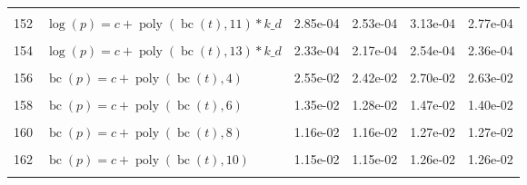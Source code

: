\documentclass[12pt,a4paper]{article}
\DeclareMathOperator{\bc}{bc}
\DeclareMathOperator{\poly}{poly}
\begin{document}
\begin{longtable}[t]{ll>{\raggedleft\arraybackslash}p{2cm}>{\raggedleft\arraybackslash}p{2cm}>{\raggedleft\arraybackslash}p{2cm}>{\raggedleft\arraybackslash}p{2cm}}
\cellcolor{gray!6}{151} & \cellcolor{gray!6}{$\log(p) = c + \poly\left( \bc(t), 10 \right) * k\_d$} & \cellcolor{gray!6}{3.64e-04} & \cellcolor{gray!6}{3.35e-04} & \cellcolor{gray!6}{4.03e-04} & \cellcolor{gray!6}{3.70e-04}\\
152 & $\log(p) = c + \poly\left( \bc(t), 11 \right) * k\_d$ & 2.85e-04 & 2.53e-04 & 3.13e-04 & 2.77e-04\\
\cellcolor{gray!6}{153} & \cellcolor{gray!6}{$\log(p) = c + \poly\left( \bc(t), 12 \right) * k\_d$} & \cellcolor{gray!6}{2.23e-04} & \cellcolor{gray!6}{2.10e-04} & \cellcolor{gray!6}{2.43e-04} & \cellcolor{gray!6}{2.27e-04}\\
154 & $\log(p) = c + \poly\left( \bc(t), 13 \right) * k\_d$ & 2.33e-04 & 2.17e-04 & 2.54e-04 & 2.36e-04\\
\cellcolor{gray!6}{155} & \cellcolor{gray!6}{$\bc(p) = c + \poly\left( \bc(t), 3 \right)$} & \cellcolor{gray!6}{5.70e-02} & \cellcolor{gray!6}{2.09e-02} & \cellcolor{gray!6}{2.31e-02} & \cellcolor{gray!6}{2.22e-02}\\
156 & $\bc(p) = c + \poly\left( \bc(t), 4 \right)$ & 2.55e-02 & 2.42e-02 & 2.70e-02 & 2.63e-02\\
\cellcolor{gray!6}{157} & \cellcolor{gray!6}{$\bc(p) = c + \poly\left( \bc(t), 5 \right)$} & \cellcolor{gray!6}{1.48e-02} & \cellcolor{gray!6}{1.48e-02} & \cellcolor{gray!6}{1.54e-02} & \cellcolor{gray!6}{1.54e-02}\\
158 & $\bc(p) = c + \poly\left( \bc(t), 6 \right)$ & 1.35e-02 & 1.28e-02 & 1.47e-02 & 1.40e-02\\
\cellcolor{gray!6}{159} & \cellcolor{gray!6}{$\bc(p) = c + \poly\left( \bc(t), 7 \right)$} & \cellcolor{gray!6}{1.24e-02} & \cellcolor{gray!6}{1.19e-02} & \cellcolor{gray!6}{1.31e-02} & \cellcolor{gray!6}{1.30e-02}\\
160 & $\bc(p) = c + \poly\left( \bc(t), 8 \right)$ & 1.16e-02 & 1.16e-02 & 1.27e-02 & 1.27e-02\\
\cellcolor{gray!6}{161} & \cellcolor{gray!6}{$\bc(p) = c + \poly\left( \bc(t), 9 \right)$} & \cellcolor{gray!6}{1.17e-02} & \cellcolor{gray!6}{1.16e-02} & \cellcolor{gray!6}{1.28e-02} & \cellcolor{gray!6}{1.28e-02}\\
162 & $\bc(p) = c + \poly\left( \bc(t), 10 \right)$ & 1.15e-02 & 1.15e-02 & 1.26e-02 & 1.26e-02\\
\cellcolor{gray!6}{163} & \cellcolor{gray!6}{$\bc(p) = c + \poly\left( \bc(t), 11 \right)$} & \cellcolor{gray!6}{1.15e-02} & \cellcolor{gray!6}{1.15e-02} & \cellcolor{gray!6}{1.26e-02} & \cellcolor{gray!6}{1.26e-02}\\

\end{longtable}
\end{document}

